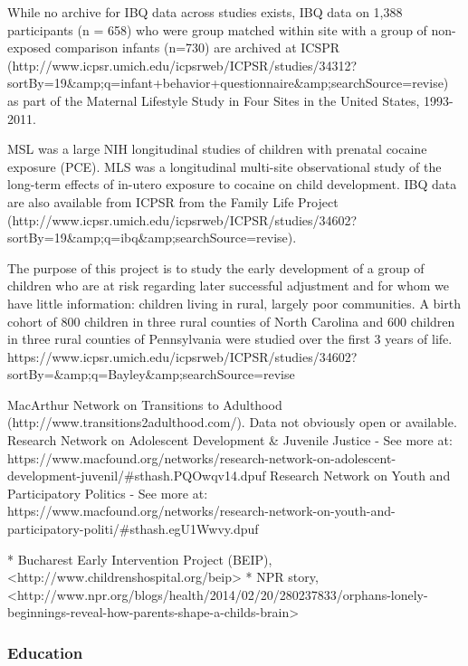 \documentclass[letterpaper,man,apacite]{apa6}
\begin{document}
While no archive for IBQ data across studies exists, IBQ data on 1,388 participants (n = 658) who were group matched within site with a group of non-exposed comparison infants (n=730) are archived at ICSPR (http://www.icpsr.umich.edu/icpsrweb/ICPSR/studies/34312?sortBy=19&amp;q=infant+behavior+questionnaire&amp;searchSource=revise) as part of the Maternal Lifestyle Study in Four Sites in the United States, 1993-2011.

MSL was a large NIH longitudinal studies of children with prenatal cocaine exposure (PCE). MLS was a longitudinal multi-site observational study of the long-term effects of in-utero exposure to cocaine on child development.
IBQ data are also available from ICPSR from the Family Life Project (http://www.icpsr.umich.edu/icpsrweb/ICPSR/studies/34602?sortBy=19&amp;q=ibq&amp;searchSource=revise).


The purpose of this project is to study the early development of a group of children who are at risk regarding later successful adjustment and for whom we have little information: children living in rural, largely poor communities. 
A birth cohort of 800 children in three rural counties of North Carolina and 600 children in three rural counties of Pennsylvania were studied over the first 3 years of life.
https://www.icpsr.umich.edu/icpsrweb/ICPSR/studies/34602?sortBy=&amp;q=Bayley&amp;searchSource=revise

MacArthur Network on Transitions to Adulthood (http://www.transitions2adulthood.com/). Data not obviously open or available.
Research Network on Adolescent Development & Juvenile Justice - See more at: https://www.macfound.org/networks/research-network-on-adolescent-development-juvenil/#sthash.PQOwqv14.dpuf
Research Network on Youth and Participatory Politics - See more at: https://www.macfound.org/networks/research-network-on-youth-and-participatory-politi/#sthash.egU1Wwvy.dpuf

* Bucharest Early Intervention Project (BEIP), <http://www.childrenshospital.org/beip>
* NPR story, <http://www.npr.org/blogs/health/2014/02/20/280237833/orphans-lonely-beginnings-reveal-how-parents-shape-a-childs-brain>

\subsubsection{Education}
\end{document}
